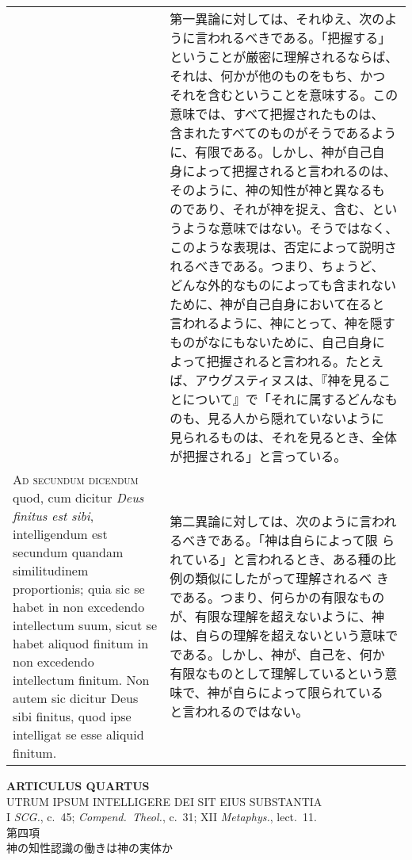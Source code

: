 \documentclass[10pt]{jsarticle} %
\begin{document}
\begin{longtable}{p{21em}p{21em}}
&

第一異論に対しては、それゆえ、次のように言われるべきである。「把握する」
ということが厳密に理解されるならば、それは、何かが他のものをもち、かつ
それを含むということを意味する。この意味では、すべて把握されたものは、
含まれたすべてのものがそうであるように、有限である。しかし、神が自己自
身によって把握されると言われるのは、そのように、神の知性が神と異なるも
のであり、それが神を捉え、含む、というような意味ではない。そうではなく、
このような表現は、否定によって説明されるべきである。つまり、ちょうど、
どんな外的なものによっても含まれないために、神が自己自身において在ると
言われるように、神にとって、神を隠すものがなにもないために、自己自身に
よって把握されると言われる。たとえば、アウグスティヌスは、『神を見るこ
とについて』で「それに属するどんなものも、見る人から隠れていないように
見られるものは、それを見るとき、全体が把握される」と言っている。

\\


{\scshape Ad secundum dicendum} quod, cum dicitur {\itshape Deus
finitus est sibi}, intelligendum est secundum quandam similitudinem
proportionis; quia sic se habet in non excedendo intellectum suum, sicut
se habet aliquod finitum in non excedendo intellectum finitum. Non autem
sic dicitur Deus sibi finitus, quod ipse intelligat se esse aliquid
finitum.

&

第二異論に対しては、次のように言われるべきである。「神は自らによって限
られている」と言われるとき、ある種の比例の類似にしたがって理解されるべ
きである。つまり、何らかの有限なものが、有限な理解を超えないように、神
は、自らの理解を超えないという意味でである。しかし、神が、自己を、何か
有限なものとして理解しているという意味で、神が自らによって限られている
と言われるのではない。



\end{longtable}
\newpage


\begin{center}
 {\Large {\bf ARTICULUS QUARTUS}}\\
 {\large UTRUM IPSUM INTELLIGERE DEI SIT EIUS SUBSTANTIA}\\
 {\footnotesize I {\itshape SCG.}, c.~45; {\itshape Compend.~Theol.},
 c.~31; XII {\itshape Metaphys.}, lect.~11.}\\
 {\Large 第四項\\神の知性認識の働きは神の実体か}
\end{center}
\end{document}
